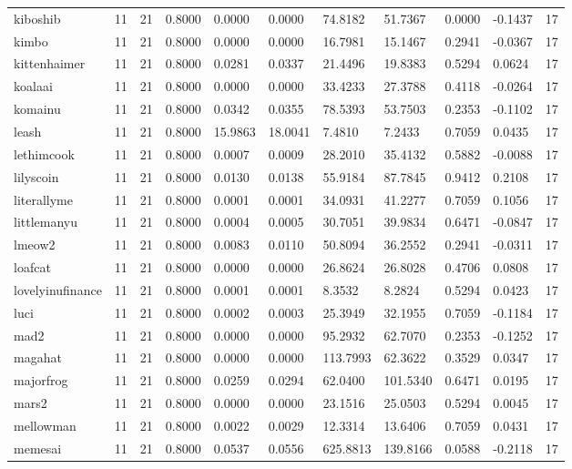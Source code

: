 \begin{table}[htbp]
\begin{tabular}{lllllllllll}
kiboshib & 11 & 21 & 0.8000 & 0.0000 & 0.0000 & 74.8182 & 51.7367 & 0.0000 & -0.1437 & 17 \\
kimbo & 11 & 21 & 0.8000 & 0.0000 & 0.0000 & 16.7981 & 15.1467 & 0.2941 & -0.0367 & 17 \\
kittenhaimer & 11 & 21 & 0.8000 & 0.0281 & 0.0337 & 21.4496 & 19.8383 & 0.5294 & 0.0624 & 17 \\
koalaai & 11 & 21 & 0.8000 & 0.0000 & 0.0000 & 33.4233 & 27.3788 & 0.4118 & -0.0264 & 17 \\
komainu & 11 & 21 & 0.8000 & 0.0342 & 0.0355 & 78.5393 & 53.7503 & 0.2353 & -0.1102 & 17 \\
leash & 11 & 21 & 0.8000 & 15.9863 & 18.0041 & 7.4810 & 7.2433 & 0.7059 & 0.0435 & 17 \\
lethimcook & 11 & 21 & 0.8000 & 0.0007 & 0.0009 & 28.2010 & 35.4132 & 0.5882 & -0.0088 & 17 \\
lilyscoin & 11 & 21 & 0.8000 & 0.0130 & 0.0138 & 55.9184 & 87.7845 & 0.9412 & 0.2108 & 17 \\
literallyme & 11 & 21 & 0.8000 & 0.0001 & 0.0001 & 34.0931 & 41.2277 & 0.7059 & 0.1056 & 17 \\
littlemanyu & 11 & 21 & 0.8000 & 0.0004 & 0.0005 & 30.7051 & 39.9834 & 0.6471 & -0.0847 & 17 \\
lmeow2 & 11 & 21 & 0.8000 & 0.0083 & 0.0110 & 50.8094 & 36.2552 & 0.2941 & -0.0311 & 17 \\
loafcat & 11 & 21 & 0.8000 & 0.0000 & 0.0000 & 26.8624 & 26.8028 & 0.4706 & 0.0808 & 17 \\
lovelyinufinance & 11 & 21 & 0.8000 & 0.0001 & 0.0001 & 8.3532 & 8.2824 & 0.5294 & 0.0423 & 17 \\
luci & 11 & 21 & 0.8000 & 0.0002 & 0.0003 & 25.3949 & 32.1955 & 0.7059 & -0.1184 & 17 \\
mad2 & 11 & 21 & 0.8000 & 0.0000 & 0.0000 & 95.2932 & 62.7070 & 0.2353 & -0.1252 & 17 \\
magahat & 11 & 21 & 0.8000 & 0.0000 & 0.0000 & 113.7993 & 62.3622 & 0.3529 & 0.0347 & 17 \\
majorfrog & 11 & 21 & 0.8000 & 0.0259 & 0.0294 & 62.0400 & 101.5340 & 0.6471 & 0.0195 & 17 \\
mars2 & 11 & 21 & 0.8000 & 0.0000 & 0.0000 & 23.1516 & 25.0503 & 0.5294 & 0.0045 & 17 \\
mellowman & 11 & 21 & 0.8000 & 0.0022 & 0.0029 & 12.3314 & 13.6406 & 0.7059 & 0.0431 & 17 \\
memesai & 11 & 21 & 0.8000 & 0.0537 & 0.0556 & 625.8813 & 139.8166 & 0.0588 & -0.2118 & 17 \\

\end{tabular}
\end{table}
